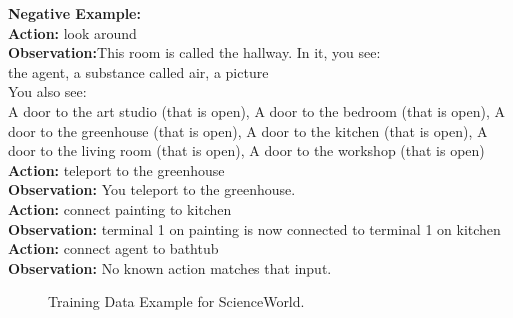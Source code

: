 \begin{tcolorbox}[breakable,title=Training Data Example for ScienceWorld]
\textcolor{my_green!50}{\textbf{Negative Example:} }\\
\textcolor{my_purple}{\textbf{Action:} look around}\\
\textcolor{my_blue!50}{\textbf{Observation:}This room is called the hallway. In it, you see:\\
        the agent, a substance called air, a picture\\
You also see:\\
        A door to the art studio (that is open), A door to the bedroom (that is open), A door to the greenhouse (that is open), A door to the kitchen (that is open), A door to the living room (that is open), A door to the workshop (that is open)}\\
\textcolor{my_purple}{\textbf{Action:} teleport to the greenhouse}\\
\textcolor{my_blue!50}{\textbf{Observation:} You teleport to the greenhouse. }\\
\textcolor{my_purple}{\textbf{Action:} connect painting to kitchen}\\
\textcolor{my_blue!50}{\textbf{Observation:} terminal 1 on painting is now connected to terminal 1 on kitchen }\\
\textcolor{my_purple}{\textbf{Action:} connect agent to bathtub}\\
\textcolor{my_blue!50}{\textbf{Observation:} No known action matches that input. }\\

\end{tcolorbox}
\begin{figure}[!htp]
    \centering
    \vspace{-8pt}
    \caption{
    Training Data Example for ScienceWorld.
    }
    \label{fig:train_data_sciworld}
\end{figure}


